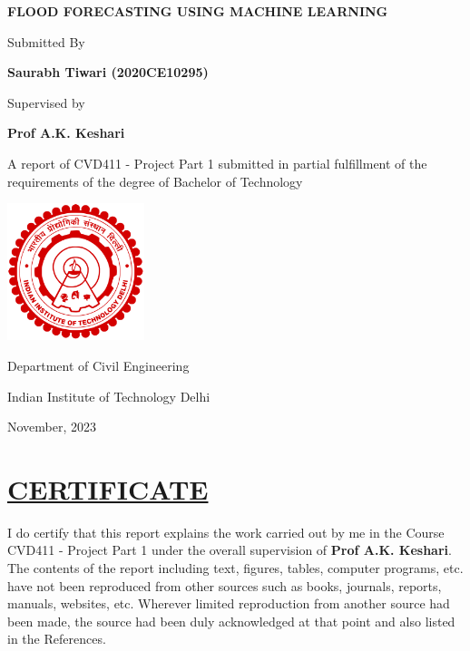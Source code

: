 \documentclass[a4paper,12pt]{report}
\begin{document}
\begin{titlepage}
    \centering
    {\Huge\bfseries FLOOD FORECASTING USING MACHINE LEARNING \par}
    \vspace{1.3cm}
    
    {\Large Submitted By \par}
    {\Large \textbf{Saurabh Tiwari (2020CE10295)} \par}
    \vspace{1.3cm}
    
    {\Large Supervised by \par}
    {\Large \textbf{Prof A.K. Keshari} \par}
    \vspace{1.3cm}

     {\Large A report of CVD411 - Project Part 1 submitted 
    in partial fulfillment of the requirements of the degree of 
    Bachelor of Technology \par}
    \vspace{1.9cm}
    
    \includegraphics[width=0.3\textwidth]{iitd-logo.png} %
    
    {\Large Department of Civil Engineering \par}
    {\Large Indian Institute of Technology Delhi \par}
    {\Large November, 2023 \par}
\end{titlepage}


\chapter*{\centering \underline{CERTIFICATE}}


I do certify that this report explains the work carried out by me in the Course CVD411 - Project Part 1 under the overall supervision of \textbf{Prof A.K. Keshari}. The contents of the report including text, figures, tables, 
computer programs, etc. have not been reproduced from other sources such as books, journals, reports, manuals, websites, etc. Wherever limited reproduction from another source had been made, the source had been duly acknowledged at that point and also listed in the References.
\end{document}
